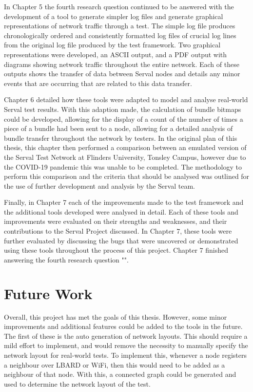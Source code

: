 In Chapter 5 the fourth research question continued to be answered with the development of a tool to generate simpler log files and generate graphical representations of network traffic through a test.
The simple log file produces chronologically ordered and consistently formatted log files of crucial log lines from the original log file produced by the test framework.
Two graphical representations were developed, an ASCII output, and a PDF output with diagrams showing network traffic throughout the entire network.
Each of these outputs shows the transfer of data between Serval nodes and details any minor events that are occurring that are related to this data transfer.

Chapter 6 detailed how these tools were adapted to model and analyse real-world Serval test results.
With this adaption made, the calculation of bundle bitmaps could be developed, allowing for the display of a count of the number of times a piece of a bundle had been sent to a node, allowing for a detailed analysis of bundle transfer throughout the network by testers.
In the original plan of this thesis, this chapter then performed a comparison between an emulated version of the Serval Test Network at Flinders University, Tonsley Campus, however due to the COVID-19 pandemic this was unable to be completed.
The methodology to perform this comparison and the criteria that should be analysed was outlined for the use of further development and analysis by the Serval team.

Finally, in Chapter 7 each of the improvements made to the test framework and the additional tools developed were analysed in detail.
Each of these tools and improvements were evaluated on their strengths and weaknesses, and their contributions to the Serval Project discussed.
In Chapter 7, these tools were further evaluated by discussing the bugs that were uncovered or demonstrated using these tools throughout the process of this project.
Chapter 7 finished answering the fourth research question "\fourthRQ".



\section{Future Work}
\label{section:futureWork}
Overall, this project has met the goals of this thesis.
However, some minor improvements and additional features could be added to the tools in the future.
The first of these is the auto generation of network layouts.
This should require a mild effort to implement, and would remove the necessity to manually specify the network layout for real-world tests.
To implement this, whenever a node registers a neighbour over LBARD or WiFi, then this would need to be added as a neighbour of that node.
With this, a connected graph could be generated and used to determine the network layout of the test.

